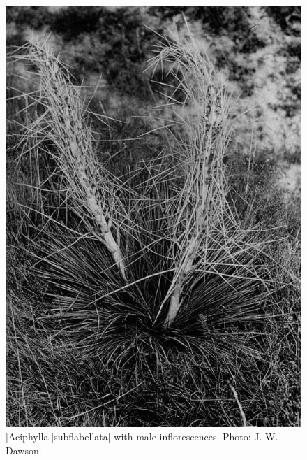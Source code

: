 \begin{figure}[t]
	\begin{minipage}[t]{\textwidth}
		\begin{minipage}[t]{(\textwidth-\fgap) * \real{0.523}}
			\centering
			\includegraphics[width=\textwidth]{graphics/figure84aciphylla.jpg}
			\caption[\emph{Aciphylla subflabellata with male inflorescencs}]{[Aciphylla][subflabellata] with male inflorescences.
			Photo:  J. W. Dawson.}%
			\label{fig:84aciphylla}
		\end{minipage}\hspace{\fgap}%
		\begin{minipage}[t]{(\textwidth-\fgap) * \real{0.477}}
			\centering

\end{minipage}
\end{minipage}
\end{figure}
